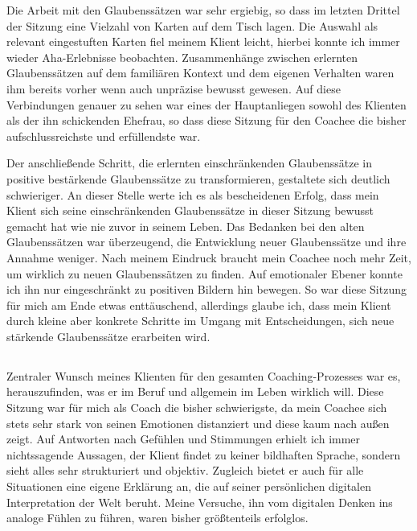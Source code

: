 \documentclass[11pt,a4paper]{article}
\begin{document}
Die Arbeit mit den Glaubenssätzen war sehr ergiebig, so dass im letzten Drittel der Sitzung eine Vielzahl von Karten auf dem Tisch lagen. Die Auswahl als relevant eingestuften Karten fiel meinem Klient leicht, hierbei konnte ich immer wieder Aha-Erlebnisse beobachten. Zusammenhänge zwischen erlernten Glaubenssätzen auf dem familiären Kontext und dem eigenen Verhalten waren ihm bereits vorher wenn auch unpräzise bewusst gewesen. Auf diese Verbindungen genauer zu sehen war eines der Hauptanliegen sowohl des Klienten als der ihn schickenden Ehefrau, so dass diese Sitzung für den Coachee die bisher aufschlussreichste und erfüllendste war. 

Der anschließende Schritt, die erlernten einschränkenden Glaubenssätze in positive bestärkende Glaubenssätze zu transformieren, gestaltete sich deutlich schwieriger. An dieser Stelle werte ich es als bescheidenen Erfolg, dass mein Klient sich seine einschränkenden Glaubenssätze in dieser Sitzung bewusst gemacht hat wie nie zuvor in seinem Leben. Das Bedanken bei den alten Glaubenssätzen war überzeugend, die Entwicklung neuer Glaubenssätze und ihre Annahme weniger. Nach meinem Eindruck braucht mein Coachee noch mehr Zeit, um wirklich zu neuen Glaubenssätzen zu finden. Auf emotionaler Ebener konnte ich ihn nur eingeschränkt zu positiven Bildern hin bewegen. So war diese Sitzung für mich am Ende etwas enttäuschend, allerdings glaube ich, dass mein Klient durch kleine aber konkrete Schritte im Umgang mit Entscheidungen, sich neue stärkende Glaubenssätze erarbeiten wird.





\subsection*{\color{Orange}{Vierte Sitzung: Identifikation der persönlichen Wünsche und Bedürfnisse}}


Zentraler Wunsch meines Klienten für den gesamten Coaching-Prozesses war es, herauszufinden, was er im Beruf und allgemein im Leben wirklich will. Diese Sitzung war für mich als Coach die bisher schwierigste, da mein Coachee sich stets sehr stark von seinen Emotionen distanziert und diese kaum nach außen zeigt. Auf Antworten nach Gefühlen und  Stimmungen erhielt ich immer nichtssagende Aussagen, der Klient findet zu keiner bildhaften Sprache, sondern sieht alles sehr strukturiert und objektiv. Zugleich bietet er auch für alle Situationen eine eigene Erklärung an, die auf seiner persönlichen digitalen Interpretation der Welt beruht. Meine Versuche, ihn vom digitalen Denken ins analoge Fühlen zu führen, waren bisher größtenteils erfolglos. 
\end{document}
